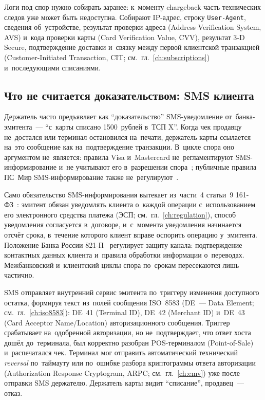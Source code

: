 Логи под спор нужно собирать заранее: к~моменту chargeback часть
технических следов уже может быть недоступна. Собирают IP-адрес,
строку \mbox{\texttt{User-Agent}}, сведения об~устройстве, результат проверки адреса
(Address Verification System, AVS) и~кода проверки карты (Card Verification
Value, CVV), результат 3-D Secure, подтверждение доставки и~связку между первой
клиентской транзакцией (Customer-Initiated Transaction, CIT;
см.~гл.~\ref{ch:subscriptions}) и~последующими списаниями.

\subsection*{Что не считается доказательством: SMS клиента}\label{sec:disputes-sms-not-evidence}

Держатель часто предъявляет как \enquote{доказательство} SMS-уведомление
от~банка-эмитента~--- \enquote{с~карты списано 1500~рублей в~ТСП X}. Когда чек
продавцу не~достался или терминал остановился на~печати,
держатель карты ссылается на~это сообщение как на~подтверждение транзакции.
В~цикле спора оно аргументом не~является: правила Visa и~Mastercard
не~регламентируют SMS-информирование и~не учитывают его в~разрешении
спора~\cite{visa-core-rules,mc-tpr}; публичные правила ПС~Мир
SMS-информирование также не~регулируют~\cite{nspk-mir-rules-v43}.

Само обязательство SMS-информирования вытекает из~части~4 статьи~9
161-ФЗ~\cite{fz-161}: эмитент обязан
уведомлять клиента о~каждой операции с~использованием его электронного средства
платежа (ЭСП; см.~гл.~\ref{ch:regulation}), способ уведомления согласуется в~договоре,
и~с~момента уведомления начинается отсчёт срока, в~течение которого клиент
вправе оспорить операцию у~эмитента. Положение Банка России
821-П~\cite{cbr-821p} регулирует защиту канала:
подтверждение контактных данных клиента и~правила обработки информации
о~переводах. Межбанковский и~клиентский циклы спора по~срокам пересекаются лишь
частично.

SMS отправляет внутренний сервис эмитента по~триггеру изменения доступного
остатка, формируя текст из~полей сообщения ISO~8583 (DE~--- Data Element;
см.~гл.~\ref{ch:iso8583}): DE~41 (Terminal ID), DE~42 (Merchant ID) и~DE~43 (Card
Acceptor Name/Location) авторизационного сообщения. Триггер срабатывает
на~одобренной авторизации, но не~подтверждает, что ответ хоста дошёл
до~терминала, был корректно разобран POS-терминалом (Point-of-Sale)
и~распечатался чек. Терминал мог отправить автоматический технический \textit{reversal}
по~таймауту или по~ошибке разбора криптограммы ответа
авторизации (Authorization Response Cryptogram, ARPC; см.~гл.~\ref{ch:emv}) уже
после отправки SMS держателю. Держатель карты видит \enquote{списание},
продавец~--- отказ.

